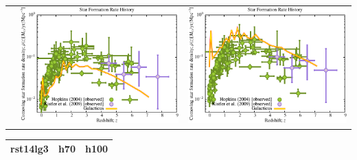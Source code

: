 \begin{itemize}
\begin{table}[p]
\begin{tabular}{l|c|c}
 & \includegraphics[scale=0.5]{r256/h70/red_st14_log2/Plot_Star_Formation_History.pdf} & \includegraphics[scale=0.5]{r256/h100/red_st14_log2/Plot_Star_Formation_History.pdf} \\
\end{tabular}
\end{table}
\begin{table}[p]
\centering
\begin{tabular}{l|c|c}
 rst14lg3 & h70 & h100 \\
\hline 

\end{tabular}
\end{table}
\end{itemize}
